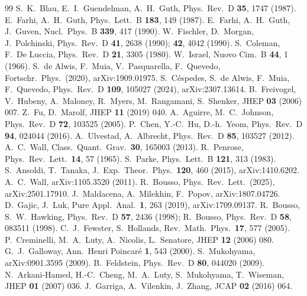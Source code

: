 \documentclass[11pt,a4paper]{article}
\theoremstyle{remark}\newtheorem{remark}[theorem]{Remark}
\begin{document}
\begin{thebibliography}{99}
 S.~K.~Blau, E.~I.~Guendelman, A.~H.~Guth, Phys.\ Rev.\ D \textbf{35}, 1747 (1987).
 E.~Farhi, A.~H.~Guth, Phys.\ Lett.\ B \textbf{183}, 149 (1987).
 E.~Farhi, A.~H.~Guth, J.~Guven, Nucl.\ Phys.\ B \textbf{339}, 417 (1990).
 W.~Fischler, D.~Morgan, J.~Polchinski, Phys.\ Rev.\ D \textbf{41}, 2638 (1990); \textbf{42}, 4042 (1990).
 S.~Coleman, F.~De Luccia, Phys.\ Rev.\ D \textbf{21}, 3305 (1980).
 W.~Israel, Nuovo Cim.\ B \textbf{44}, 1 (1966).
 S.~de Alwis, F.~Muia, V.~Pasquarella, F.~Quevedo, Fortschr.\ Phys.\ (2020), arXiv:1909.01975.
 S.~C\'espedes, S.~de Alwis, F.~Muia, F.~Quevedo, Phys.\ Rev.\ D \textbf{109}, 105027 (2024), arXiv:2307.13614.
 B.~Freivogel, V.~Hubeny, A.~Maloney, R.~Myers, M.~Rangamani, S.~Shenker, JHEP \textbf{03} (2006) 007.
 Z.~Fu, D.~Marolf, JHEP \textbf{11} (2019) 040.
 A.~Aguirre, M.~C.~Johnson, Phys.\ Rev.\ D \textbf{72}, 103525 (2005).
 P.~Chen, Y.-C.~Hu, D.-h.~Yeom, Phys.\ Rev.\ D \textbf{94}, 024044 (2016).
 A.~Ulvestad, A.~Albrecht, Phys.\ Rev.\ D \textbf{85}, 103527 (2012).
 A.~C.~Wall, Class.\ Quant.\ Grav.\ \textbf{30}, 165003 (2013).
 R.~Penrose, Phys.\ Rev.\ Lett.\ \textbf{14}, 57 (1965).
 S.~Parke, Phys.\ Lett.\ B \textbf{121}, 313 (1983).
 S.~Ansoldi, T.~Tanaka, J.\ Exp.\ Theor.\ Phys.\ \textbf{120}, 460 (2015), arXiv:1410.6202.
 A.~C.~Wall, arXiv:1105.3520 (2011).
 R.~Bousso, Phys.\ Rev.\ Lett.\ (2025), arXiv:2501.17910.
 J.~Maldacena, A.~Milekhin, F.~Popov, arXiv:1807.04726.
 D.~Gajic, J.~Luk, Pure Appl.\ Anal.\ \textbf{1}, 263 (2019), arXiv:1709.09137.
 R.~Bousso, S.~W.~Hawking, Phys.\ Rev.\ D \textbf{57}, 2436 (1998); R.~Bousso, Phys.\ Rev.\ D \textbf{58}, 083511 (1998).
 C.~J.~Fewster, S.~Hollands, Rev.\ Math.\ Phys.\ \textbf{17}, 577 (2005).
 P.~Creminelli, M.~A.~Luty, A.~Nicolis, L.~Senatore, JHEP \textbf{12} (2006) 080.
 G.~J.~Galloway, Ann.\ Henri Poincar\'e \textbf{1}, 543 (2000).
 S.~Mukohyama, arXiv:0901.3595 (2009).
 B.~Feldstein, Phys.\ Rev.\ D \textbf{80}, 044020 (2009).
 N.~Arkani-Hamed, H.-C.~Cheng, M.~A.~Luty, S.~Mukohyama, T.~Wiseman, JHEP \textbf{01} (2007) 036.
 J.~Garriga, A.~Vilenkin, J.~Zhang, JCAP \textbf{02} (2016) 064.

\end{thebibliography}
\end{document}
